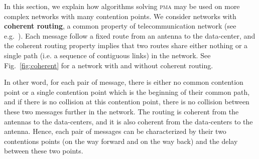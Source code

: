 \documentclass[a4paper,UKenglish,cleveref, autoref, thm-restate]{lipics-v2019}
\newcommand\pma{\textsc{pma}\xspace}
\begin{document}
In this section, we explain how algorithms solving \pma may be used on more complex networks with many contention points.
We consider networks with \textbf{coherent routing}, a common property of telecommunication network (see e.g.~\cite{Schwiebert1996ANA}).
Each message follow a fixed route from an antenna to the data-center, and the coherent routing property implies that two routes
share either nothing or a single path (i.e. a sequence of contiguous links) in the network. See Fig.~\ref{fig:coherent} for a network with and without coherent routing.

In other word, for each pair of message, there is either no common contention point or a single contention point
which is the beginning of their common path, and if there is no collision at this contention point, there is no collision between these two messages further in the network.
The routing is coherent from the antennas to the data-centers, and it is also coherent from the data-centers to the antenna. 
Hence, each pair of messages can be characterized by their two contentions points (on the way forward and on the way back) and the delay between these two points. 
\end{document}
